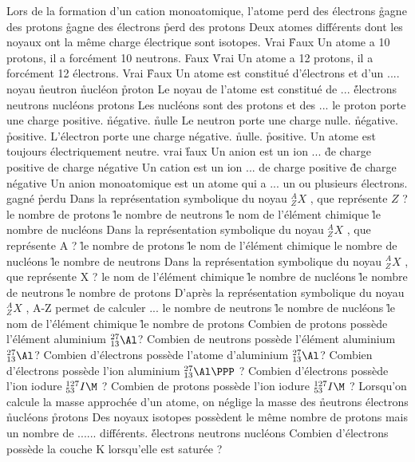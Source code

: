 \q
Lors de la formation d'un cation monoatomique, l'atome
\rv
perd des électrons
\r
gagne des protons
\r
gagne des électrons
\r
perd des protons
\q
Deux atomes différents dont les noyaux ont la même charge électrique sont isotopes.
\rv
Vrai
\r
Faux
\q 
Un atome a 10 protons, il a forcément 10 neutrons.
\rv
Faux
\r
Vrai
\q
Un atome a 12 protons, il a forcément 12 électrons.
\rv
Vrai
\r
Faux
\q
Un atome est constitué d'électrons et d'un ....
\rv
noyau
\r
neutron
\r
nucléon
\r
proton
\q
Le noyau de l'atome est constitué de ...
\r
électrons
\rv
neutrons
\rv
nucléons
\rv
protons
\q
Les nucléons sont des protons et des ...
\q
le proton porte une charge
\rv
positive.
\r
négative.
\r
nulle
\q
Le neutron porte une charge
\rv
nulle.
\r
négative.
\r
positive.
\q
L'électron porte une charge
\rv
négative.
\r
nulle.
\r
positive.
\q
Un atome est toujours électriquement neutre.
\rv
vrai
\r
faux
\q
Un anion est un ion ...
\r
de charge positive
\rv
de charge négative
\q
Un cation est un ion ...
\rv
de charge positive
\r
de charge négative
\q
Un anion monoatomique est un atome qui a ... un ou plusieurs électrons.
\rv
gagné
\r
perdu
\q
Dans la représentation symbolique du noyau $_Z^AX$ , que représente $Z$ ?
\rv
le nombre de protons
\r
le nombre de neutrons
\r
le nom de l'élément chimique
\r
le nombre de nucléons
\q
Dans la représentation symbolique du noyau $_Z^AX$ , que représente A  ?
\r
le nombre de protons
\r
le nom de l'élément chimique
\rv
le nombre de nucléons
\r
le nombre de neutrons
\q
Dans la représentation symbolique du noyau $_Z^AX$ , que représente X  ?
\rv
le nom de l'élément chimique
\r
le nombre de nucléons
\r
le nombre de neutrons
\r
le nombre de protons
\q
D'après la représentation symbolique du noyau $_Z^AX$ , A-Z permet de calculer ...
\rv
le nombre de neutrons
\r
le nombre de nucléons
\r
le nom de l'élément chimique
\r
le nombre de protons
\q
Combien de protons possède l'élément aluminium $_{13}^{27}\Al$?
\q
Combien de neutrons possède l'élément aluminium $_{13}^{27}\Al$?
\q
Combien d'électrons possède l'atome d'aluminium $_{13}^{27}\Al$?
\q
Combien d'électrons possède l'ion aluminium $_{13}^{27}\Al\PPP$ ?
\q
Combien d'électrons possède l'ion iodure $_{53}^{127}I\M $ ?
\q
Combien de protons possède l'ion iodure $_{53}^{127}I\M $  ?
\q
Lorsqu'on calcule la masse approchée d'un atome, on néglige la masse des
\r
neutrons
\rv
électrons
\r
nucléons
\r
protons
\q
Des noyaux isotopes possèdent le même nombre de protons mais un nombre de ...... différents.
\r
électrons
\rv
neutrons
\rv
nucléons
\q
Combien d'électrons possède la couche K lorsqu'elle est saturée ?
